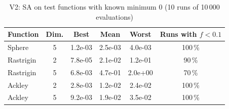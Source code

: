 \begin{table}[htbp]
\centering
\caption{V2: \ac{SA} on test functions with known minimum 0 (10 runs of 10\,000 evaluations)}
\label{tab:v2}
\footnotesize
\begin{tabular}{@{}lccccc@{}}
\toprule
Function & Dim. & Best & Mean & Worst & Runs with $f<0.1$ \\
\midrule
Sphere & 5 & 1.2e-03 & 2.5e-03 & 4.0e-03 & 100\,\% \\
Rastrigin & 2 & 7.8e-05 & 2.1e-02 & 1.2e-01 & 90\,\% \\
Rastrigin & 5 & 6.8e-03 & 4.7e-01 & 2.0e+00 & 70\,\% \\
Ackley & 2 & 2.8e-03 & 1.2e-02 & 2.4e-02 & 100\,\% \\
Ackley & 5 & 9.2e-03 & 1.9e-02 & 3.5e-02 & 100\,\% \\
\bottomrule
\end{tabular}
\end{table}
